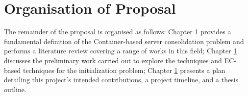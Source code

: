 \section{Organisation of Proposal}
The remainder of the proposal is organised as follows: Chapter \ref{} provides a fundamental
definition of the Container-based server consolidation problem and performs a literature review covering a range of works in this field; Chapter \ref{} discusses the preliminary work carried out to
explore the techniques and EC-based techniques for the initialization problem; Chapter \ref{} presents a plan
detailing this project’s intended contributions, a project timeline, and a thesis outline.